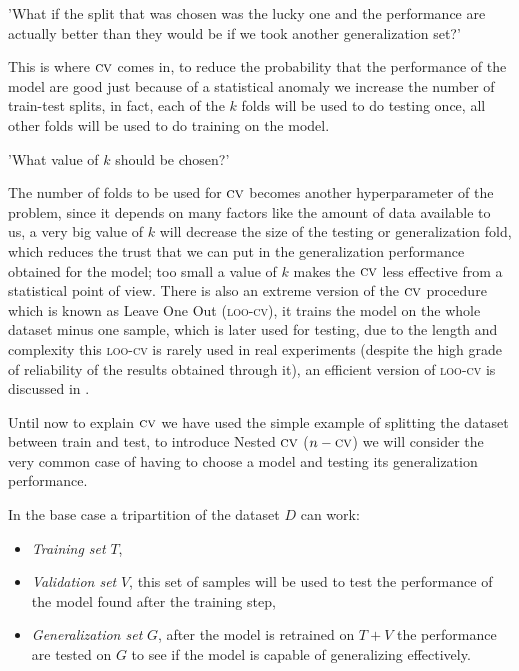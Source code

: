 \medskip

'What if the split that was chosen was the lucky one and the performance are actually better than
they would be if we took another generalization set?'

\smallskip

This is where $\textsc{cv}$ comes in, to reduce the probability that the performance of the model
are good just because of a statistical anomaly we increase the number of train-test splits, in fact,
each of the $k$ folds will be used to do testing once, all other folds will be used to do training
on the model.

\medskip

'What value of $k$ should be chosen?'

\smallskip

The number of folds to be used for $\textsc{cv}$ becomes another hyperparameter of the problem, since it
depends on many factors like the amount of data available to us, a very big value of $k$ will
decrease the size of the testing or generalization fold, which reduces the trust that we can put in
the generalization performance obtained for the model; too small a value of $k$ makes the $\textsc{cv}$ less
effective from a statistical point of view. There is also an extreme version of the $\textsc{cv}$ procedure
which is known as Leave One Out (\textsc{loo-cv}), it trains the model on the whole dataset minus
one sample, which is later used for testing, due to the length and complexity this \textsc{loo-cv}
is rarely used in real experiments (despite the high grade of reliability of the results obtained
through it), an efficient version of \textsc{loo-cv} is discussed in \cite{shao2016}.

Until now to explain $\textsc{cv}$ we have used the simple example of splitting the dataset between train
and test, to introduce Nested $\textsc{cv}$ ($n-\textsc{cv}$) we will consider the very common case of having to
choose a model and testing its generalization performance.

In the base case a tripartition of the dataset $D$ can work:
\begin{itemize}
	\item \emph{Training set} $T$,
	\item \emph{Validation set} $V$, this set of samples will be used to test the performance of the
	      model found after the training step,
	\item \emph{Generalization set} $G$, after the model is retrained on $T + V$ the performance are
	      tested on $G$ to see if the model is capable of generalizing effectively.
\end{itemize}

